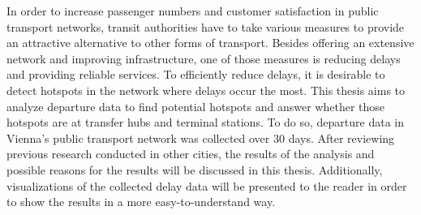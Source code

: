 In order to increase passenger numbers and customer satisfaction in public transport networks, transit authorities have to take various measures to provide an attractive alternative to other forms of transport. Besides offering an extensive network and improving infrastructure, one of those measures is reducing delays and providing reliable services. To efficiently reduce delays, it is desirable to detect hotspots in the network where delays occur the most. This thesis aims to analyze departure data to find potential hotspots and answer whether those hotspots are at transfer hubs and terminal stations. To do so, departure data in Vienna's public transport network was collected over 30 days. After reviewing previous research conducted in other cities, the results of the analysis and possible reasons for the results will be discussed in this thesis. Additionally, visualizations of the collected delay data will be presented to the reader in order to show the results in a more easy-to-understand way.